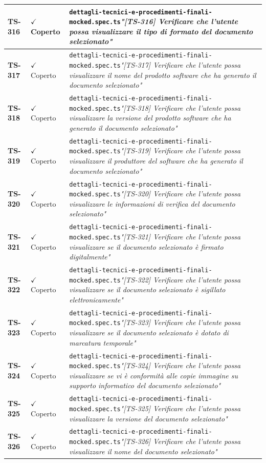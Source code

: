 \documentclass[a4paper,12pt]{article}
\newcommand{\ok}{\textcolor{green!60!black}{$\checkmark$ Coperto}}
\newcommand{\f}[1]{\nolinkurl{#1}\newline}
\newcommand{\q}[1]{\textit{#1}}
\begin{document}
\begin{longtable}{|p{1.5cm}|p{3.0cm}|p{10.5cm}|}
\textbf{TS-316} & \ok & \f{dettagli-tecnici-e-procedimenti-finali-mocked.spec.ts}\q{"[TS-316] Verificare che l'utente possa visualizzare il tipo di formato del documento selezionato"} \\ \hline
\textbf{TS-317} & \ok & \f{dettagli-tecnici-e-procedimenti-finali-mocked.spec.ts}\q{"[TS-317] Verificare che l'utente possa visualizzare il nome del prodotto software che ha generato il documento selezionato"} \\ \hline
\textbf{TS-318} & \ok & \f{dettagli-tecnici-e-procedimenti-finali-mocked.spec.ts}\q{"[TS-318] Verificare che l'utente possa visualizzare la versione del prodotto software che ha generato il documento selezionato"} \\ \hline
\textbf{TS-319} & \ok & \f{dettagli-tecnici-e-procedimenti-finali-mocked.spec.ts}\q{"[TS-319] Verificare che l'utente possa visualizzare il produttore del software che ha generato il documento selezionato"} \\ \hline
\textbf{TS-320} & \ok & \f{dettagli-tecnici-e-procedimenti-finali-mocked.spec.ts}\q{"[TS-320] Verificare che l'utente possa visualizzare le informazioni di verifica del documento selezionato"} \\ \hline
\textbf{TS-321} & \ok & \f{dettagli-tecnici-e-procedimenti-finali-mocked.spec.ts}\q{"[TS-321] Verificare che l'utente possa visualizzare se il documento selezionato è firmato digitalmente"} \\ \hline
\textbf{TS-322} & \ok & \f{dettagli-tecnici-e-procedimenti-finali-mocked.spec.ts}\q{"[TS-322] Verificare che l'utente possa visualizzare se il documento selezionato è sigillato elettronicamente"} \\ \hline
\textbf{TS-323} & \ok & \f{dettagli-tecnici-e-procedimenti-finali-mocked.spec.ts}\q{"[TS-323] Verificare che l'utente possa visualizzare se il documento selezionato è dotato di marcatura temporale"} \\ \hline
\textbf{TS-324} & \ok & \f{dettagli-tecnici-e-procedimenti-finali-mocked.spec.ts}\q{"[TS-324] Verificare che l'utente possa visualizzare se vi è conformità alle copie immagine su supporto informatico del documento selezionato"} \\ \hline
\textbf{TS-325} & \ok & \f{dettagli-tecnici-e-procedimenti-finali-mocked.spec.ts}\q{"[TS-325] Verificare che l'utente possa visualizzare la versione del documento selezionato"} \\ \hline
\textbf{TS-326} & \ok & \f{dettagli-tecnici-e-procedimenti-finali-mocked.spec.ts}\q{"[TS-326] Verificare che l'utente possa visualizzare il nome del documento selezionato"} \\ \hline

\end{longtable}
\end{document}
